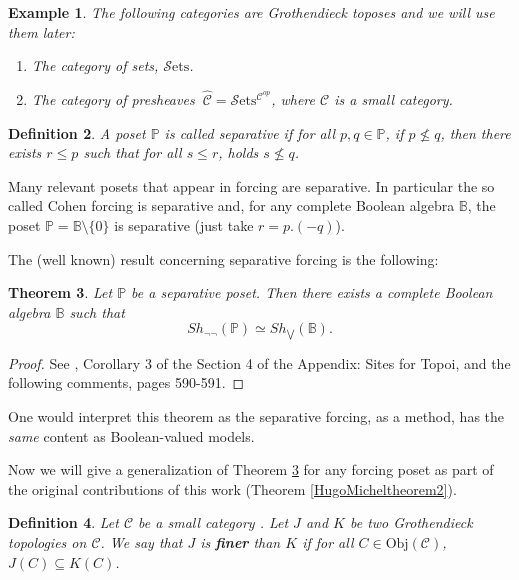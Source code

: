 \documentclass[10pt,a4paper]{amsart}
\newtheorem{Theo}{Theorem}[section]
\newtheorem{Def}[Theo]{Definition}
\newtheorem{Ex}[Theo]{Example}
\newcommand{\C}{\mathcal{C}}
\newcommand{\Sets}{\mathcal{S}\text{ets}}
\newcommand{\Po}{\mathbb{P}}
\newcommand{\B}{\mathbb{B}}
\begin{document}
\begin{Ex}
	The following categories are Grothendieck toposes and we will use them later:
	\begin{enumerate}
		\item The category of sets, $\Sets$.
		\item The category of presheaves $~\widehat{\C} = \Sets^{\C^{op}}$, where $\C$ is a small category.
	\end{enumerate}
\end{Ex}


\begin{Def}\label{separativeposet}
    A poset $\Po$ is called separative if for all $p, q \in \Po$, if $p \nleq q$, then there exists $r \leq p$ such that for all $s \leq r$, holds $s \nleq q$.
\end{Def}


 Many relevant posets that appear in  forcing are separative. In particular the so called Cohen forcing is separative and, for any complete Boolean algebra $\B$, the poset $\Po = \B \setminus \{0\}$ is separative (just take $r = p . (- q)$).

The (well known) result concerning separative forcing is the following:



 
    
    


\begin{Theo}\label{equivalenceofcategoriesdensemorphismseparative}
	Let $\Po$ be a separative poset. Then there exists a complete Boolean algebra $\mathbb{B}$ such that 
	$$Sh_{\neg \neg}(\Po) \simeq Sh_{\bigvee}(\mathbb{B}).$$
\end{Theo}
\begin{proof}
See \cite{MacMoe94},  Corollary 3 of the Section 4 of the Appendix: Sites for Topoi, and the following comments, pages 590-591.
\end{proof}

One would interpret this theorem as the separative forcing, as a method, has the \emph{same} content as Boolean-valued models. 

Now we will give a generalization of Theorem \ref{equivalenceofcategoriesdensemorphismseparative} for any forcing poset as part of the original contributions of this work (Theorem \ref{HugoMicheltheorem2}).




\begin{Def}
	Let $\C$ be a small category . Let $J$ and $K$ be two Grothendieck topologies on $\C$. We say that $J$ is \textbf{finer} than $K$ if for all $C \in \text{Obj}(\C)$, $J(C)\subseteq K(C)$.
\end{Def}
\end{document}
